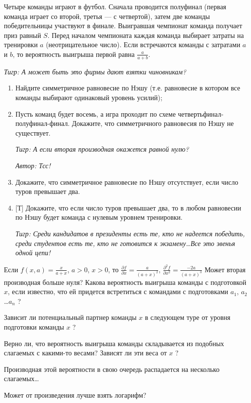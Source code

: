 \begin{problem}[Футбол]
Четыре команды играют в футбол. Сначала проводится полуфинал (первая команда играет со второй, третья --- с четвертой), затем две команды победительницы участвуют в финале. Выигравшая чемпионат команда получает приз равный  $S$. Перед началом чемпионата каждая команда выбирает затраты на тренировки  $a$  (неотрицательное число). Если встречаются команды с затратами  $a$  и  $b$, то вероятность выигрыша первой равна  $\frac{a}{a+b} $.\par
{\it Тигр: А может быть это фирмы дают взятки чиновникам?}\par
\begin{enumerate}
\item Найдите симметричное  равновесие  по Нэшу (т.е. равновесие в котором все команды выбирают одинаковый уровень усилий);\par
\item Пусть команд будет восемь, а игра проходит по схеме четвертьфинал-полуфинал-финал. Докажите, что симметричного равновесия по Нэшу не существует.\par
{\it Тигр: А если вторая производная  окажется равной нулю?}\par
{\it  Автор: Тсс!}\par
\item  Докажите, что симметричное равновесие по Нэшу отсутствует, если число туров превышает два.\par
\item {[Т]} Докажите, что если число туров превышает два, то в любом равновесии по Нэшу будет команда с нулевым уровнем тренировки.\par
{\it Тигр: Среди кандидатов в президенты есть те, кто не надеется победить, среди студентов есть те, кто не готовится к экзамену\ldots Все это звенья одной цепи!}
\end{enumerate}



\begin{sol}
Если  $f\left(x,a\right)=\frac{x}{a+x} $,  $a>0$,  $x>0$, то  $\frac{\partial f}{\partial x} =\frac{a}{\left(a+x\right)^{2} } $,  $\frac{\partial ^{2} f}{\partial x^{2} } =\frac{-2a}{\left(a+x\right)^{3} } $
Может вторая производная больше нуля?
Какова вероятность выигрыша команды с подготовкой  $x$, если известно, что ей придется встретиться с командами с подготовками  $a_{1} $,  $a_{2} $ \ldots  $a_{n} $ ? \par
Зависит ли потенциальный партнер команды  $x$  в следующем туре от уровня подготовки команды  $x$ ?\par
Верно ли, что вероятность выигрыша команды складывается из подобных слагаемых с какими-то весами? Зависят ли эти веса от  $x$ ?\par
Производная этой вероятности в свою очередь распадается на несколько слагаемых\ldots \par
Может от произведения лучше взять логарифм?
\end{sol}
\end{problem}


